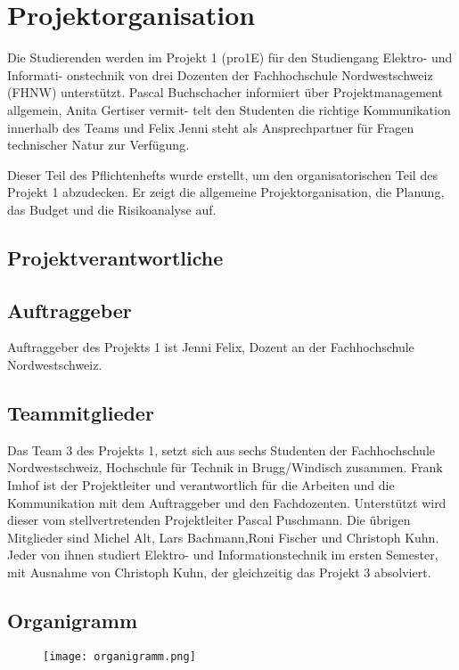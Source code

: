 \section{Projektorganisation}

Die Studierenden werden im Projekt 1 (pro1E) für den Studiengang Elektro- und Informati- onstechnik von drei Dozenten der Fachhochschule Nordwestschweiz (FHNW) unterstützt. Pascal Buchschacher informiert über Projektmanagement allgemein, Anita Gertiser vermit- telt den Studenten die richtige Kommunikation innerhalb des Teams und Felix Jenni steht als Ansprechpartner für Fragen technischer Natur zur Verfügung.

Dieser Teil des Pflichtenhefts wurde erstellt, um den organisatorischen Teil des Projekt 1 abzudecken. Er zeigt die allgemeine Projektorganisation, die Planung, das Budget und die Risikoanalyse auf.
\subsection{Projektverantwortliche}

\subsection{Auftraggeber}
Auftraggeber des Projekts 1 ist Jenni Felix, Dozent an der Fachhochschule Nordwestschweiz.

\subsection{Teammitglieder}
Das Team 3 des Projekts 1, setzt sich aus sechs Studenten der Fachhochschule Nordwestschweiz, Hochschule für Technik in Brugg/Windisch zusammen. Frank Imhof ist der Projektleiter und verantwortlich für die Arbeiten und die Kommunikation mit dem Auftraggeber und den Fachdozenten. Unterstützt wird dieser vom stellvertretenden Projektleiter Pascal Puschmann. Die übrigen Mitglieder sind Michel Alt, Lars Bachmann,Roni Fischer und Christoph Kuhn. Jeder von ihnen studiert Elektro- und Informationstechnik im ersten Semester, mit Ausnahme von Christoph Kuhn, der gleichzeitig das Projekt 3 absolviert.

\subsection{Organigramm}
\begin{figure}[H]
	\centering
	\texttt{[image: organigramm.png]}
	\label{fig:Organigramm}
\end{figure}
